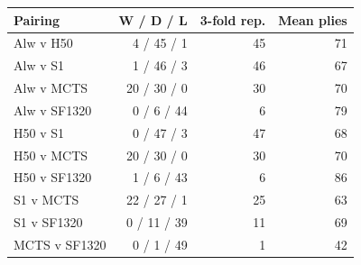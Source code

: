 \footnotesize\setlength{\tabcolsep}{4pt}\begin{tabular}{lrrr}
\toprule
Pairing & W / D / L & 3-fold rep. & Mean plies \\
\midrule
Alw v H50 & 4 / 45 / 1 & 45 & 71 \\
Alw v S1 & 1 / 46 / 3 & 46 & 67 \\
Alw v MCTS & 20 / 30 / 0 & 30 & 70 \\
Alw v SF1320 & 0 / 6 / 44 & 6 & 79 \\
H50 v S1 & 0 / 47 / 3 & 47 & 68 \\
H50 v MCTS & 20 / 30 / 0 & 30 & 70 \\
H50 v SF1320 & 1 / 6 / 43 & 6 & 86 \\
S1 v MCTS & 22 / 27 / 1 & 25 & 63 \\
S1 v SF1320 & 0 / 11 / 39 & 11 & 69 \\
MCTS v SF1320 & 0 / 1 / 49 & 1 & 42 \\
\bottomrule
\end{tabular}
